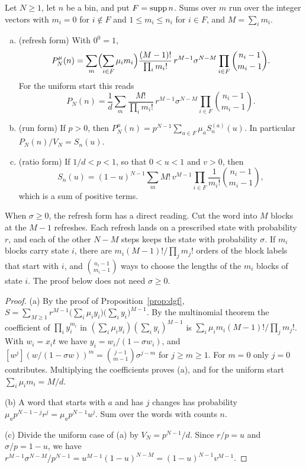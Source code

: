\begin{proposition}\label{prop:dpmf}
Let $N\ge1$, let $n$ be a bin, and put $F=\operatorname{supp} n$. Sums over $m$ run over the
integer vectors with $m_i=0$ for $i\notin F$ and $1\le m_i\le n_i$ for
$i\in F$, and $M=\sum_im_i$.
\begin{enumerate}[(a)]
\item (refresh form) With $0^0=1$,
\[
P^\mu_N(n)=\sum_m\Bigl(\sum_{i\in F}\mu_im_i\Bigr)\frac{(M-1)!}{\prod_im_i!}\,
r^{M-1}\sigma^{N-M}\prod_{i\in F}\binom{n_i-1}{m_i-1}.
\]
For the uniform start this reads
\[
P_N(n)=\frac1d\sum_m\frac{M!}{\prod_im_i!}\,
r^{M-1}\sigma^{N-M}\prod_{i\in F}\binom{n_i-1}{m_i-1}.
\]
\item (run form) If $p>0$, then $P^\mu_N(n)=p^{N-1}\sum_{a\in F}\mu_aS^{(a)}_n(u)$.
In particular $P_N(n)/V_N=S_n(u)$.
\item (ratio form) If $1/d<p<1$, so that $0<u<1$ and $v>0$, then
\begin{equation}\label{eq:simplex-positive-sum}
S_n(u)=(1-u)^{N-1}\sum_mM!\,v^{M-1}\prod_{i\in F}\frac1{m_i!}\binom{n_i-1}{m_i-1},
\end{equation}
which is a sum of positive terms.
\end{enumerate}
\end{proposition}

When $\sigma\ge0$, the refresh form has a direct reading. Cut the word into $M$
blocks at the $M-1$ refreshes. Each refresh lands on a prescribed state with
probability $r$, and each of the other $N-M$ steps keeps the state with
probability $\sigma$. If $m_i$ blocks carry state $i$, there are
$m_i(M-1)!/\prod_jm_j!$ orders of the block labels that start with $i$, and
$\binom{n_i-1}{m_i-1}$ ways to choose the lengths of the $m_i$ blocks of state
$i$. The proof below does not need $\sigma\ge0$.

\begin{proof}
(a) By the proof of Proposition~\ref{prop:dgf},
$S=\sum_{M\ge1}r^{M-1}\bigl(\sum_i\mu_iy_i\bigr)\bigl(\sum_iy_i\bigr)^{M-1}$. By the
multinomial theorem the coefficient of $\prod_iy_i^{m_i}$ in
$(\sum_i\mu_iy_i)(\sum_iy_i)^{M-1}$ is $\sum_i\mu_im_i(M-1)!/\prod_jm_j!$. With
$w_i=x_it$ we have $y_i=w_i/(1-\sigma w_i)$, and
$[w^j](w/(1-\sigma w))^m=\binom{j-1}{m-1}\sigma^{j-m}$ for $j\ge m\ge1$. For
$m=0$ only $j=0$ contributes. Multiplying the coefficients proves (a), and for
the uniform start $\sum_i\mu_im_i=M/d$.

(b) A word that starts with $a$ and has $j$ changes has probability
$\mu_ap^{N-1-j}r^j=\mu_ap^{N-1}u^j$. Sum over the words with counts $n$.

(c) Divide the uniform case of (a) by $V_N=p^{N-1}/d$. Since $r/p=u$ and
$\sigma/p=1-u$, we have
$r^{M-1}\sigma^{N-M}/p^{N-1}=u^{M-1}(1-u)^{N-M}=(1-u)^{N-1}v^{M-1}$.
\end{proof}

